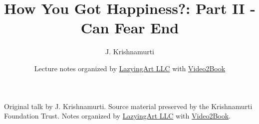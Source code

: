 \documentclass[11pt,oneside]{book}
\begin{document}
\frontmatter
\title{How You Got Happiness?: Part II - Can Fear End}
\author{J. Krishnamurti}
\date{Lecture notes organized by \href{https://lazying.art}{LazyingArt LLC} with \href{https://github.com/lachlanchen/Video2Book}{Video2Book}}
\maketitle
\begin{center}
\small Original talk by J. Krishnamurti. Source material preserved by the Krishnamurti Foundation Trust. Notes organized by \href{https://lazying.art}{LazyingArt LLC} with \href{https://github.com/lachlanchen/Video2Book}{Video2Book}.
\end{center}
\clearpage
\mainmatter

\end{document}
